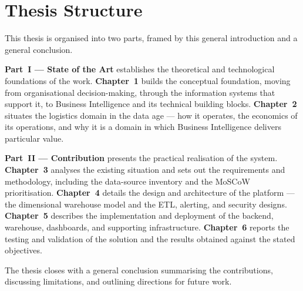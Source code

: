 \section*{Thesis Structure}

This thesis is organised into two parts, framed by this general introduction and a general
conclusion.

\textbf{Part~I --- State of the Art} establishes the theoretical and technological foundations of
the work. \textbf{Chapter~1} builds the conceptual foundation, moving from organisational
decision-making, through the information systems that support it, to Business Intelligence and its
technical building blocks. \textbf{Chapter~2} situates the logistics domain in the data age --- how it
operates, the economics of its operations, and why it is a domain in which Business Intelligence
delivers particular value.

\textbf{Part~II --- Contribution} presents the practical realisation of the system.
\textbf{Chapter~3} analyses the existing situation and sets out the requirements and methodology,
including the data-source inventory and the MoSCoW prioritisation. \textbf{Chapter~4} details the
design and architecture of the platform --- the dimensional warehouse model and the ETL,
alerting, and security designs. \textbf{Chapter~5} describes the implementation and deployment of
the backend, warehouse, dashboards, and supporting infrastructure. \textbf{Chapter~6} reports the
testing and validation of the solution and the results obtained against the stated objectives.

The thesis closes with a general conclusion summarising the contributions, discussing
limitations, and outlining directions for future work.
